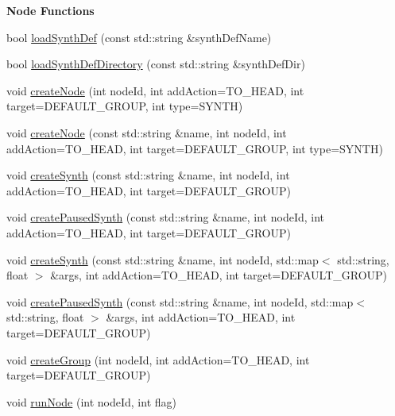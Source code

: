 \begin{Indent}{\bf Node Functions}\par
\begin{DoxyCompactItemize}
\item 
bool \hyperlink{classsc_1_1SCServer_abb82887e9757e1fa0df687344db73ba5}{load\-Synth\-Def} (const std\-::string \&synth\-Def\-Name)
\item 
bool \hyperlink{classsc_1_1SCServer_adc5a4cc11762007cfcad404f5eaf2699}{load\-Synth\-Def\-Directory} (const std\-::string \&synth\-Def\-Dir)
\item 
void \hyperlink{classsc_1_1SCServer_aee46c819d9e4e146e0a53d06eccd7a95}{create\-Node} (int node\-Id, int add\-Action=T\-O\-\_\-\-H\-E\-A\-D, int target=D\-E\-F\-A\-U\-L\-T\-\_\-\-G\-R\-O\-U\-P, int type=S\-Y\-N\-T\-H)
\item 
void \hyperlink{classsc_1_1SCServer_a2ac7cabe7d491c6ecd9193635f25aa77}{create\-Node} (const std\-::string \&name, int node\-Id, int add\-Action=T\-O\-\_\-\-H\-E\-A\-D, int target=D\-E\-F\-A\-U\-L\-T\-\_\-\-G\-R\-O\-U\-P, int type=S\-Y\-N\-T\-H)
\item 
void \hyperlink{classsc_1_1SCServer_ac94bcf8ddce587e836631a23f1059088}{create\-Synth} (const std\-::string \&name, int node\-Id, int add\-Action=T\-O\-\_\-\-H\-E\-A\-D, int target=D\-E\-F\-A\-U\-L\-T\-\_\-\-G\-R\-O\-U\-P)
\item 
void \hyperlink{classsc_1_1SCServer_ab8b14584833941f06693f097d381e551}{create\-Paused\-Synth} (const std\-::string \&name, int node\-Id, int add\-Action=T\-O\-\_\-\-H\-E\-A\-D, int target=D\-E\-F\-A\-U\-L\-T\-\_\-\-G\-R\-O\-U\-P)
\item 
void \hyperlink{classsc_1_1SCServer_a7baac4a701937c38d421aa4ed265350b}{create\-Synth} (const std\-::string \&name, int node\-Id, std\-::map$<$ std\-::string, float $>$ \&args, int add\-Action=T\-O\-\_\-\-H\-E\-A\-D, int target=D\-E\-F\-A\-U\-L\-T\-\_\-\-G\-R\-O\-U\-P)
\item 
void \hyperlink{classsc_1_1SCServer_a0cc7ed517234f06d42d24f4576201155}{create\-Paused\-Synth} (const std\-::string \&name, int node\-Id, std\-::map$<$ std\-::string, float $>$ \&args, int add\-Action=T\-O\-\_\-\-H\-E\-A\-D, int target=D\-E\-F\-A\-U\-L\-T\-\_\-\-G\-R\-O\-U\-P)
\item 
void \hyperlink{classsc_1_1SCServer_a9aab99e02f70516217b320fc6c453951}{create\-Group} (int node\-Id, int add\-Action=T\-O\-\_\-\-H\-E\-A\-D, int target=D\-E\-F\-A\-U\-L\-T\-\_\-\-G\-R\-O\-U\-P)
\item 
void \hyperlink{classsc_1_1SCServer_a22b904f4d18160178d8dff424579b821}{run\-Node} (int node\-Id, int flag)

\end{DoxyCompactItemize}
\end{Indent}

